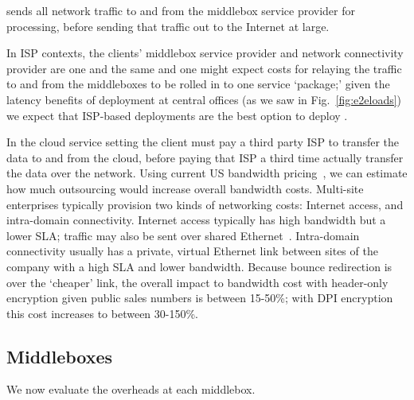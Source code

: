 \sys sends all network traffic to and from the middlebox service provider for processing, before sending that traffic out to the Internet at large. 

In ISP contexts, the clients' middlebox service provider and network connectivity provider are one and the same and one might expect costs for relaying the traffic to and from the middleboxes to be rolled in to one service `package;' given the latency benefits of deployment at central offices (as we saw in Fig.~\ref{fig:e2eloads}) we expect that ISP-based deployments are the best option to deploy \sys.

In the cloud service setting the client must pay a third party ISP to transfer the data to and from the cloud, before paying that ISP a third time actually transfer the data over the network.
Using current US bandwidth pricing~\cite{comcast-costs, megapath-costs, verizon-costs}, we can estimate how much outsourcing would increase overall bandwidth costs.
Multi-site enterprises typically provision two kinds of networking costs: Internet access, and intra-domain connectivity. 
Internet access typically has high bandwidth but a lower SLA; traffic may also be sent over shared Ethernet~\cite{comcast-costs, verizon-costs}.
Intra-domain connectivity usually has a private, virtual Ethernet link between sites of the company with a high SLA and lower bandwidth.
Because bounce redirection is over the `cheaper' link, the overall impact to bandwidth cost with header-only encryption given public sales numbers is between 15-50\%; with DPI encryption this cost increases to between 30-150\%. 


\subsection{Middleboxes}
\label{sec:evalcloud}

We now evaluate the overheads at each middlebox. 

